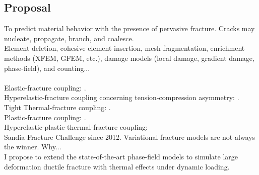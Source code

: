 \subsection{Proposal}

\begin{frame}{}
To predict material behavior with the presence of pervasive fracture. Cracks may nucleate, propagate, branch, and coalesce. \\
\bigskip
\pause
{}
Element deletion, cohesive element insertion, mesh fragmentation, enrichment methods (XFEM, GFEM, etc.), damage models (local damage, gradient damage, phase-field), and counting...\\
\bigskip
\pause
{} \\
Elastic-fracture coupling: \cite{Francfort98, Bourdin2000, bourdin2008variational, karma_2001, karma_2004, henry_2004, spatschek_2007, amor_2009}. \\
Hyperelastic-fracture coupling concerning tension-compression asymmetry: \cite{borden2012isogeometric, zhang2016variational}. \\
Tight Thermal-fracture coupling: \cite{miehe2015phase, ulmer2013phase}. \\
Plastic-fracture coupling: \cite{alessi2018coupling, ambati2016phase, borden2016phase, duda2015phase, kuhn2016phase, miehe2016phase}. \\
Hyperelastic-plastic-thermal-fracture coupling: \cite{miehe2015phase} \\
\bigskip
\pause
{}
Sandia Fracture Challenge since 2012. Variational fracture models are not always the winner. Why... \\
\bigskip
\pause
{}
I propose to extend the state-of-the-art phase-field models to simulate large deformation ductile fracture with thermal effects under dynamic loading.
\end{frame}
